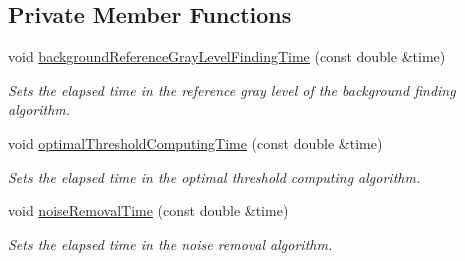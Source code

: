 \subsection*{Private Member Functions}
\begin{CompactItemize}
\item 
void \hyperlink{class_statistics_f8a60e8a89be8fe8b2c46782681c1a2c}{backgroundReferenceGrayLevelFindingTime} (const double \&time)
\begin{CompactList}\small\item\em Sets the elapsed time in the reference gray level of the background finding algorithm. \item\end{CompactList}\item 
void \hyperlink{class_statistics_eed35a930f29f4596f3715306e1e1dbc}{optimalThresholdComputingTime} (const double \&time)
\begin{CompactList}\small\item\em Sets the elapsed time in the optimal threshold computing algorithm. \item\end{CompactList}\item 
void \hyperlink{class_statistics_4ad24aec4e5491b7d3afca143e6deb05}{noiseRemovalTime} (const double \&time)
\begin{CompactList}\small\item\em Sets the elapsed time in the noise removal algorithm. \item\end{CompactList}\end{CompactItemize}
